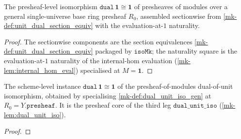 \begin{definition}\label{mk-def:dual_unit_iso_gen}
  \leanok

  The presheaf-level isomorphism
  \(\mathtt{dual}\,\mathbf 1 \cong \mathbf 1\) of presheaves of modules over a general
  single-universe base ring presheaf \(R_0\), assembled sectionwise from
  \ref{mk-def:unit_dual_section_equiv} with the evaluation-at-\(1\) naturality.
\end{definition}
\begin{proof}
  \leanok
 The sectionwise components are the section equivalences
  \ref{mk-def:unit_dual_section_equiv} packaged by \(\mathtt{isoMk}\); the naturality square is
  the evaluation-at-\(1\) naturality of the internal-hom evaluation
  (\ref{mk-lem:internal_hom_eval}) specialised at \(M = \mathbf 1\).
\end{proof}

\begin{definition}\label{mk-def:presheaf_dual_unit_iso}
  \leanok

  The scheme-level instance \(\mathtt{dual}\,\mathbf 1 \cong \mathbf 1\) of the
  presheaf-of-modules dual-of-unit isomorphism, obtained by specialising
  \ref{mk-def:dual_unit_iso_gen} at \(R_0 = Y.\mathtt{presheaf}\). It is the presheaf core of
  the third leg \(\mathtt{dual\_unit\_iso}\) (\ref{mk-lem:dual_unit_iso}).
\end{definition}
\begin{proof}
  \leanok

\end{proof}

